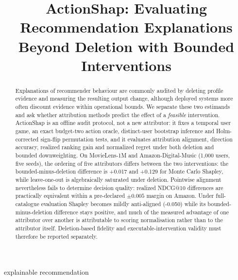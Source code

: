 \documentclass[preprint,12pt,numbers,sort&compress]{elsarticle}
\newcommand{\safeinput}[1]{}
\newcommand{\resultmanifeststamp}{see code/results/manifest.json}
\begin{document}
\begin{frontmatter}

\title{ActionShap: Evaluating Recommendation Explanations Beyond Deletion with Bounded Interventions}

\begin{abstract}
Explanations of recommender behaviour are commonly audited by deleting profile evidence and measuring the resulting output change, although deployed systems more often discount evidence within operational bounds. We separate these two estimands and ask whether attribution methods predict the effect of a \emph{feasible} intervention. ActionShap is an offline audit protocol, not a new attributor: it fixes a temporal user game, an exact budget-two action oracle, distinct-user bootstrap inference and Holm-corrected sign-flip permutation tests, and it evaluates attribution alignment, direction accuracy, realized ranking gain and normalized regret under both deletion and bounded downweighting. On MovieLens-1M and Amazon-Digital-Music (1,000 users, five seeds), the ordering of five attributors differs between the two interventions: the bounded-minus-deletion difference is +0.017 and +0.129 for Monte Carlo Shapley, while leave-one-out is algebraically saturated under deletion. Pointwise alignment nevertheless fails to determine decision quality: realized NDCG@10 differences are practically equivalent within a pre-declared $\pm0.005$ margin on Amazon. Under full-catalogue evaluation Shapley becomes mildly anti-aligned (-0.050) while its bounded-minus-deletion difference stays positive, and much of the measured advantage of one attributor over another is attributable to scoring normalisation rather than to the attributor itself. Deletion-based fidelity and executable-intervention validity must therefore be reported separately.
\end{abstract}


\begin{keyword}\sepword
\sepword
{explainable recommendation}
\end{keyword}

\end{frontmatter}





\end{document}
